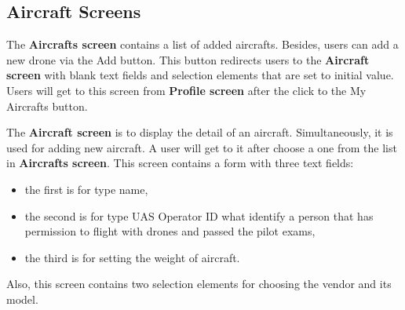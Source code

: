 \subsection{Aircraft Screens}\label{subsec:aircraft-screens}
The \textbf{Aircrafts screen} contains a list of added aircrafts.
Besides, users can add a new drone via the Add button.
This button redirects users to the \textbf{Aircraft screen} with blank text fields and selection elements that are set to initial value.
Users will get to this screen from \textbf{Profile screen} after the click to the My Aircrafts button.

The \textbf{Aircraft screen} is to display the detail of an aircraft.
Simultaneously, it is used for adding new aircraft.
A user will get to it after choose a one from the list in \textbf{Aircrafts screen}.
This screen contains a form with three text fields:
\begin{itemize}
    \item the first is for type name,
    \item the second is for type UAS Operator ID what identify a person that has permission to flight with drones and passed the pilot exams,
    \item the third is for setting the weight of aircraft.
\end{itemize}
Also, this screen contains two selection elements for choosing the vendor and its model.
